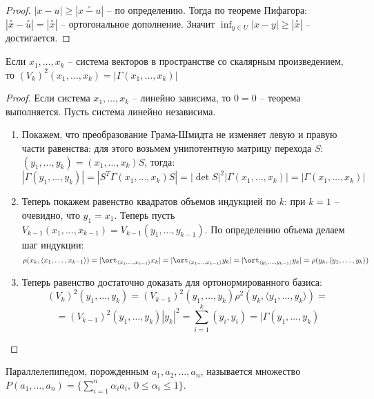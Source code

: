 \begin{proof}
    $|x - u| \geq |\stackrel{\circ}{x - u}|$ -- по определению. Тогда по теореме Пифагора: $|\stackrel{\circ}{x} - \stackrel{\circ}{u}| = |\stackrel{\circ}{x}|$ -- ортогональное дополнение. Значит $\inf_{y \in U} |x - y| \geq |\stackrel{\circ}{x}|$ -- достигается.
\end{proof}

\begin{theorem}
    Если $x_1, \dots, x_k$ -- система векторов в пространстве со скалярным произведением, то $(V_k)^2(x_1, \dots, x_k) = |\Gamma(x_1, \dots, x_k)|$
\end{theorem}

\begin{proof}
    Если система $x_1, \dots, x_k$ -- линейно зависима, то $0 = 0$ -- теорема выполняется. Пусть система линейно независима.
    \begin{enumerate}
        \item Покажем, что преобразование Грама-Шмидта не изменяет левую и правую части равенства: для этого возьмем унипотентную матрицу перехода $S$: $(y_1, \dots, y_k) = (x_1, \dots, x_k)S$, тогда:
        $$|\Gamma(y_1, \dots, y_k)| = |S^T \Gamma(x_1, \dots, x_k)S| = |\det S|^2 |\Gamma(x_1, \dots, x_k)| = |\Gamma (x_1, \dots, x_k)|$$
        \item Теперь покажем равенство квадратов объемов индукцией по $k$: при $k = 1$ -- очевидно, что $y_1 = x_1$. Теперь пусть $V_{k - 1} (x_1, \dots, x_{k - 1}) = V_{k - 1}(y_1, \dots, y_{k - 1})$. По определению объема делаем шаг индукции:
        $$\rho(x_k, \langle x_1, \dots, x_{k -1} \rangle) = |\ort_{\langle x_1, \dots, x_{k -1} \rangle} x_k| = |\ort_{\langle x_1, \dots, x_{k -1} \rangle} y_k| = |\ort_{\langle y_1, \dots, y_{k -1} \rangle} y_k| = \rho(y_k, \langle y_1, \dots, y_k \rangle)$$
        \item Теперь равенство достаточно доказать для ортонормированного базиса:
        \[(V_k)^2(y_1, \dots, y_k) = (V_{k - 1})^2(y_1, \dots, y_k) \rho^2(y_k, \langle y_1, \dots, y_k \rangle) = \]\[ = (V_{k - 1})^2(y_1, \dots, y_k) |y_k|^2 = \displaystyle\sum_{i = 1}^{k} (y_i, y_i) = |\Gamma (y_1, \dots, y_k)\]
    \end{enumerate}
\end{proof}

\begin{definition}
    Параллелепипедом, порожденным $a_1, a_2, \ldots, a_n$, называется множество $P(a_1, \ldots, a_n) = \{\sum_{i = 1}^{n}\alpha_i a_i , \ 0 \leq \alpha_i \leq 1\}$. 
\end{definition}

